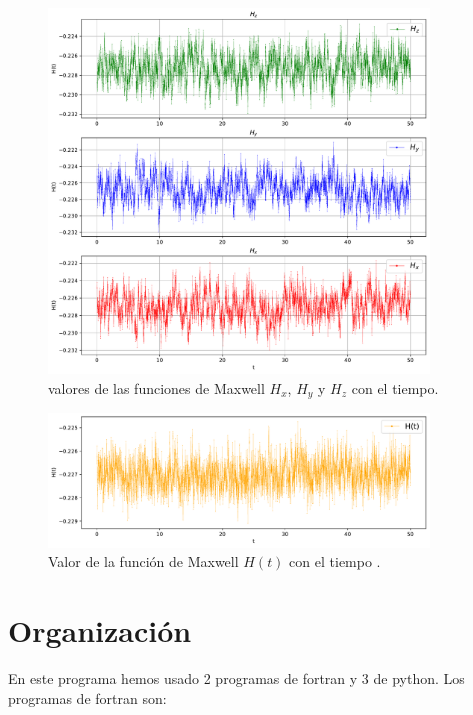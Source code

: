 \documentclass[11pt]{article} %
\begin{document}
\newpage
	
\begin{figure}[h!] \centering
	\includegraphics[width=0.9\textwidth]{../../Graficas/H_Boltzmann_xyz_2.pdf}
	\caption{valores de las funciones de Maxwell $H_x$, $H_y$ y $H_z$ con el tiempo.}
	\label{Fig:07}
\end{figure}
	
\begin{figure}[h!] \centering
	\includegraphics[width=0.9\textwidth]{../../Graficas/H_Boltzmann_2.pdf}
	\caption{Valor de la función de Maxwell $H(t)$ con el tiempo .}
	\label{Fig:08}
\end{figure}	
	
\newpage	

\section{Organización}

En este programa hemos usado 2 programas de fortran y 3 de python. Los programas de fortran son:
\end{document}
